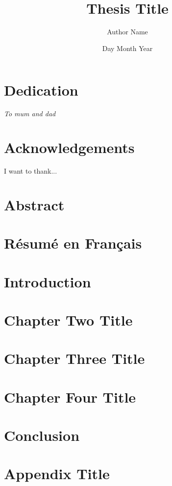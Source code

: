 \documentclass[12pt,twoside]{report}
\title{Thesis Title}
\author{Author Name}
\date{Day Month Year}
\begin{document}


\pagestyle{myplain}
\chapter*{Dedication}
    \begin{center}
    \vspace{4cm}
    \textit{To mum and dad}
    \end{center}

\chapter*{Acknowledgements}
I want to thank...

\newpage
\thispagestyle{empty}
\mbox{}
\chapter*{Abstract}


\newpage
{}
%
\chapter*{Résumé en Français}

\tableofcontents

\listoffigures

\listoftables
\cleardoublepage{}
\pagestyle{myfancy}

\chapter{Introduction}


\chapter{Chapter Two Title}


\chapter{Chapter Three Title}


\chapter{Chapter Four Title}


\chapter{Conclusion}


\appendix
\chapter{Appendix Title}


\printbibliography[heading=bibintoc]
\end{document}
